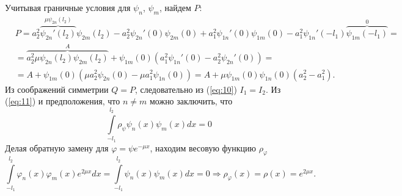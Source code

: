 \documentclass[12pt, a4paper]{article}
\begin{document}
Учитывая граничные условия для $\psi_n$, $\psi_m$, найдем $P$:
\begin{equation}
  \begin{aligned}
    &P=a_2^2\overbrace{\psi_{2n}'(l_2)}^{\mu\psi_{2n}(l_2)}\psi_{2m}(l_2) - a_2^2 \psi_{2n}'(0) \psi_{2m}(0) + a_1^2 \psi_{1n}'(0) \psi_{1m}(0) - a_1^2 \psi_{1n}'(-l_1) \overbrace{\psi_{1m}(-l_1)}^0=\\
    & = \overbrace{a_2^2\mu\psi_{2n}(l_2)\psi_{2m}(l_2)}^{A} + \psi_{1m}(0)(a_1^2 \psi_{1n}'(0) - a_2^2\psi_{2n}'(0)) =\\
    & = A + \psi_{1m}(0)(\mu a_2^2 \psi_{2n}(0) - \mu a_1^2 \psi_{1n}(0)) = A + \mu \psi_{1m}(0)\psi_{1n}(0)(a_2^2 - a_1^2).
  \end{aligned}
\end{equation}
Из соображений симметрии $Q = P$, следовательно из (\ref{eq:10}) $I_1 = I_2$. Из (\ref{eq:11}) и предположения, что $n \ne m$ можно заключить, что
\begin{equation}
  \int \limits_{-l_1}^{l_2} \rho_\psi \psi_n(x) \psi_m(x) dx = 0
\end{equation}
Делая обратную замену для $\varphi = \psi e^{-\mu x}$, находим весовую функцию $\rho_\varphi$
\begin{equation}
  \int \limits_{-l_1}^{l_2} \varphi_n(x) \varphi_m(x) e^{2 \mu x} dx = \int \limits_{-l_1}^{l_2} \psi_n(x) \psi_m(x) dx = 0 \Rightarrow \rho_\varphi(x) = \rho(x) = e^{2 \mu x}.
\end{equation}
\end{document}
